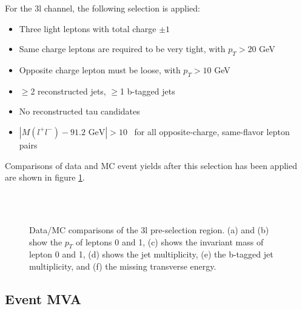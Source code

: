 For the 3l channel, the following selection is applied:

\begin{itemize}
  \item Three light leptons with total charge $\pm 1$
  \item Same charge leptons are required to be very tight, with $p_T > 20$ GeV
  \item Opposite charge lepton must be loose, with $p_T > 10$ GeV
  \item $\geq$2 reconstructed jets, $\geq$1 b-tagged jets                                              
  \item No reconstructed tau candidates
  \item $|M(l^+l^-)-91.2\textrm{ GeV}| > 10$~\GeV{} for all opposite-charge, same-flavor lepton pairs
\end{itemize}

Comparisons of data and MC event yields after this selection has been applied are shown in figure \ref{fig:presel3l}.

\begin{figure}[h!]
    \\                             
    \\                         
    \caption{Data/MC comparisons of the 3l pre-selection region. (a) and (b) show the $p_T$ of leptons 0 and 1, (c) shows the invariant mass of lepton 0 and 1, (d) shows the jet multiplicity, (e) the b-tagged jet multiplicity, and (f) the missing transverse energy.}
    \label{fig:presel3l}                                                                                          
\end{figure}


\subsection{Event MVA}
\label{subsec:sigBkgMVA}

